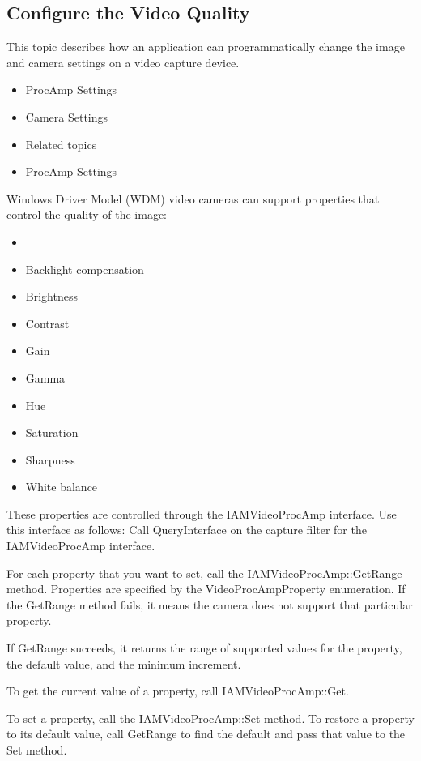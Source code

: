 \subsection{Configure the Video Quality}
This topic describes how an application can programmatically change the image and camera settings on a video capture device.

\begin{itemize}
	\item ProcAmp Settings
	\item Camera Settings
	\item Related topics
	\item ProcAmp Settings
\end{itemize}

Windows Driver Model (WDM) video cameras can support properties that control the quality of the image:

\begin{itemize}
	\item 	\item Backlight compensation
	\item Brightness
	\item Contrast
	\item Gain
	\item Gamma
	\item Hue
	\item Saturation
	\item Sharpness
	\item White balance

\end{itemize}
These properties are controlled through the IAMVideoProcAmp interface. Use this interface as follows:
Call QueryInterface on the capture filter for the IAMVideoProcAmp interface.

For each property that you want to set, call the IAMVideoProcAmp::GetRange method. Properties are specified by the VideoProcAmpProperty enumeration. If the GetRange method fails, it means the camera does not support that particular property.

If GetRange succeeds, it returns the range of supported values for the property, the default value, and the minimum increment.

To get the current value of a property, call IAMVideoProcAmp::Get.

To set a property, call the IAMVideoProcAmp::Set method. To restore a property to its default value, call GetRange to find the default and pass that value to the Set method.

